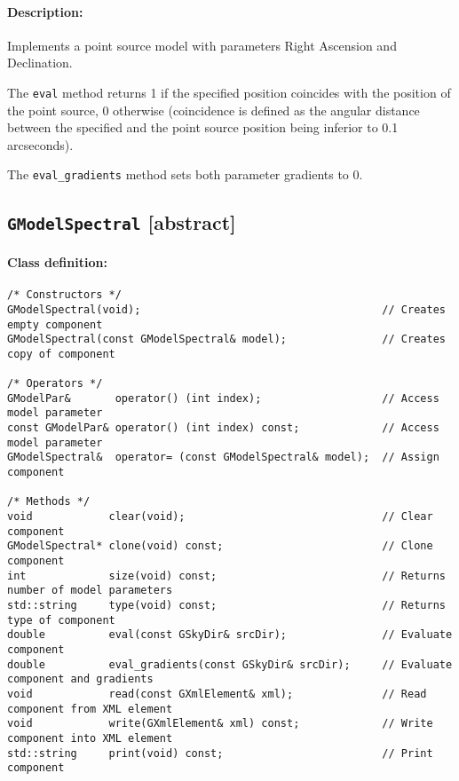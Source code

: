 \documentclass{article}[12pt,a4]
\begin{document}
\paragraph{Description:}
Implements a point source model with parameters Right Ascension and Declination.

The {\tt eval} method returns 1 if the specified position coincides with the position
of the point source, 0 otherwise (coincidence is defined as the angular distance between
the specified and the point source position being inferior to 0.1 arcseconds).

The {\tt eval\_gradients} method sets both parameter gradients to 0.


\newpage
\subsection{{\tt GModelSpectral} \small[abstract]}

\paragraph{Class definition:}
\begin{verbatim}
/* Constructors */
GModelSpectral(void);                                      // Creates empty component
GModelSpectral(const GModelSpectral& model);               // Creates copy of component

/* Operators */
GModelPar&       operator() (int index);                   // Access model parameter
const GModelPar& operator() (int index) const;             // Access model parameter
GModelSpectral&  operator= (const GModelSpectral& model);  // Assign component

/* Methods */
void            clear(void);                               // Clear component
GModelSpectral* clone(void) const;                         // Clone component
int             size(void) const;                          // Returns number of model parameters
std::string     type(void) const;                          // Returns type of component
double          eval(const GSkyDir& srcDir);               // Evaluate component
double          eval_gradients(const GSkyDir& srcDir);     // Evaluate component and gradients
void            read(const GXmlElement& xml);              // Read component from XML element
void            write(GXmlElement& xml) const;             // Write component into XML element
std::string     print(void) const;                         // Print component
\end{verbatim}
\end{document}
